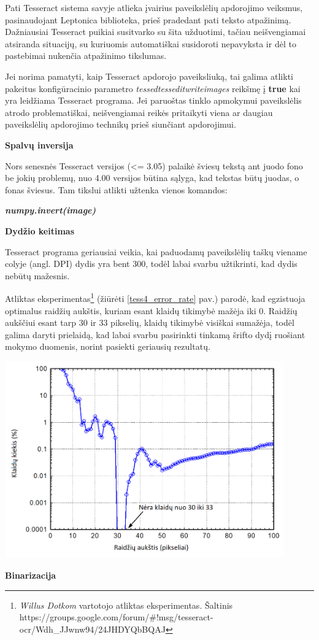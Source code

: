 \documentclass{VUMIFInfBakalaurinis}
\begin{document}
Pati Tesseract sistema savyje atlieka įvairius paveikslėlių apdorojimo veiksmus, pasinaudojant Leptonica biblioteka, prieš pradedant pati teksto atpažinimą.
Dažniausiai Tesseract puikiai susitvarko su šita užduotimi, tačiau neišvengiamai atsiranda situacijų, su kuriuomis automatiškai susidoroti nepavyksta ir dėl to pastebimai nukenčia
atpažinimo tikslumas.

Jei norima pamatyti, kaip Tesseract apdorojo paveiksliuką, tai galima atlikti pakeitus konfigūracinio parametro \textit{tessedtessedit\textunderscore write\textunderscore images} reikšmę į \textbf{true}
kai yra leidžiama Tesseract programa. Jei paruoštas tinklo apmokymui paveikslėlis atrodo problematiškai, neišvengiamai reikės pritaikyti viena ar daugiau paveikslėlių apdorojimo technikų
prieš siunčiant apdorojimui.

\textbf{Spalvų inversija}

Nors senesnės Tesseract versijos (<= 3.05) palaikė šviesų tekstą ant juodo fono be jokių problemų, nuo 4.00 versijos būtina sąlyga, kad tekstas būtų juodas, o fonas šviesus.
Tam tikslui atlikti užtenka vienos komandos:

\textbf{\textit{numpy.invert(image)}}

\textbf{Dydžio keitimas}

Tesseract programa geriausiai veikia, kai paduodamų paveikslėlių taškų viename colyje (angl. DPI) dydis yra bent 300, todėl labai svarbu užtikrinti, kad dydis nebūtų mažesnis.

Atliktas eksperimentas\footnote{\textit{Willus Dotkom} vartotojo atliktas eksperimentas. Šaltinis https://groups.google.com/forum/\#!msg/tesseract-ocr/Wdh\_JJwnw94/24JHDYQbBQAJ}
(žiūrėti \ref{tess4_error_rate} pav.) parodė, kad egzistuoja optimalus raidžių aukštis, kuriam esant klaidų tikimybė mažėja iki 0. Raidžių aukščiui esant tarp 30 ir 33 pikselių, klaidų tikimybė visiškai sumažėja,
todėl galima daryti prielaidą, kad labai svarbu pasirinkti tinkamą šrifto dydį ruošiant mokymo duomenis, norint pasiekti geriausių rezultatų.

\begin{minipage}{\linewidth}
  \includegraphics[width=12cm]{tess4_error_rate.png}
  \label{tess4_error_rate}
\end{minipage}
\textbf{Binarizacija}
\end{document}
